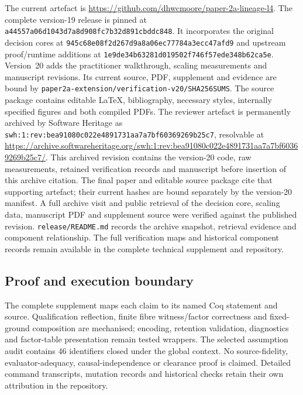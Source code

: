 \documentclass[twocolumn,envcountsect,envcountsame,natbib]{svjour3}
\begin{document}
The current artefact is \url{https://github.com/dhwcmoore/paper-2a-lineage-l4}. The complete version-19 release is pinned at \nolinkurl{a44557a06d1043d7a8d908fc7b32d891cbddc848}. It incorporates the original decision cores at \nolinkurl{945c68e08f2d267d9a8a06ec77784a3ecc47afd9} and upstream proof/runtime additions at \nolinkurl{1e9de34b63281d019502f746f57ede348b62ca5e}. Version~20 adds the practitioner walkthrough, scaling measurements and manuscript revisions. Its current source, PDF, supplement and evidence are bound by \nolinkurl{paper2a-extension/verification-v20/SHA256SUMS}. The source package contains editable LaTeX, bibliography, necessary styles, internally specified figures and both compiled PDFs. The reviewer artefact is permanently archived by Software Heritage as \nolinkurl{swh:1:rev:bea91080c022e4891731aa7a7bf60369269b25c7}, resolvable at \url{https://archive.softwareheritage.org/swh:1:rev:bea91080c022e4891731aa7a7bf60369269b25c7/}. This archived revision contains the version-20 code, raw measurements, retained verification records and manuscript before insertion of this archive citation. The final paper and editable source package cite that supporting artefact; their current hashes are bound separately by the version-20 manifest. A full archive visit and public retrieval of the decision core, scaling data, manuscript PDF and supplement source were verified against the published revision. \nolinkurl{release/README.md} records the archive snapshot, retrieval evidence and component relationship. The full verification maps and historical component records remain available in the complete technical supplement and repository.

\subsection{Proof and execution boundary}
\label{ex:tab:verification-map}\label{ex:tab:trust-boundary}
The complete supplement maps each claim to its named Coq statement and source. Qualification reflection, finite fibre witness/factor correctness and fixed-ground composition are mechanised; encoding, retention validation, diagnostics and factor-table presentation remain tested wrappers. The selected assumption audit contains 46 identifiers closed under the global context. No source-fidelity, evaluator-adequacy, causal-independence or clearance proof is claimed. Detailed command transcripts, mutation records and historical checks retain their own attribution in the repository.
\end{document}
